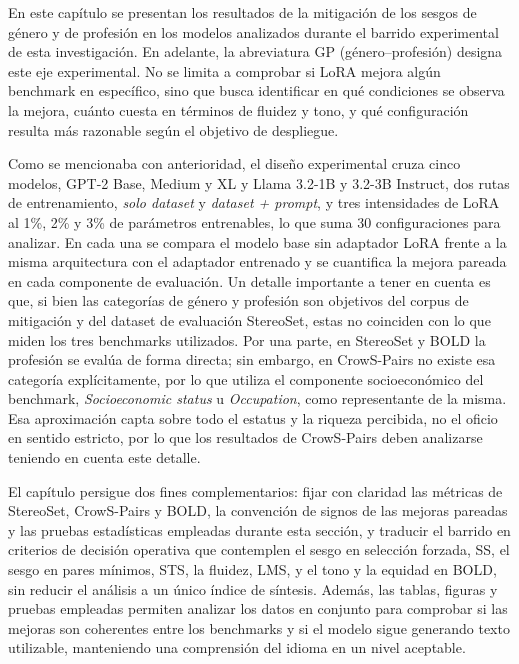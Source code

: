 \documentclass[12pt,a4paper]{report}
\newcommand{\GP}{GP (género--profesión)}
\begin{document}
En este capítulo se presentan los resultados de la mitigación de los sesgos de género y de profesión en los modelos analizados durante el barrido experimental de esta investigación. En adelante, la abreviatura \GP{} designa este eje experimental. No se limita a comprobar si LoRA mejora algún benchmark en específico, sino que busca identificar en qué condiciones se observa la mejora, cuánto cuesta en términos de fluidez y tono, y qué configuración resulta más razonable según el objetivo de despliegue.

Como se mencionaba con anterioridad, el diseño experimental cruza cinco modelos, GPT-2 Base, Medium y XL y Llama 3.2-1B y 3.2-3B Instruct, dos rutas de entrenamiento, \textit{solo dataset} y \textit{dataset + prompt}, y tres intensidades de LoRA al 1\%, 2\% y 3\% de parámetros entrenables, lo que suma 30 configuraciones para analizar. En cada una se compara el modelo base sin adaptador LoRA frente a la misma arquitectura con el adaptador entrenado y se cuantifica la mejora pareada en cada componente de evaluación. Un detalle importante a tener en cuenta es que, si bien las categorías de género y profesión son objetivos del corpus de mitigación y del dataset de evaluación StereoSet, estas no coinciden con lo que miden los tres benchmarks utilizados. Por una parte, en StereoSet y BOLD la profesión se evalúa de forma directa; sin embargo, en CrowS-Pairs no existe esa categoría explícitamente, por lo que utiliza el componente socioeconómico del benchmark, \textit{Socioeconomic status} u \textit{Occupation}, como representante de la misma. Esa aproximación capta sobre todo el estatus y la riqueza percibida, no el oficio en sentido estricto, por lo que los resultados de CrowS-Pairs deben analizarse teniendo en cuenta este detalle.

El capítulo persigue dos fines complementarios: fijar con claridad las métricas de StereoSet, CrowS-Pairs y BOLD, la convención de signos de las mejoras pareadas y las pruebas estadísticas empleadas durante esta sección, y traducir el barrido en criterios de decisión operativa que contemplen el sesgo en selección forzada, SS, el sesgo en pares mínimos, STS, la fluidez, LMS, y el tono y la equidad en BOLD, sin reducir el análisis a un único índice de síntesis. Además, las tablas, figuras y pruebas empleadas permiten analizar los datos en conjunto para comprobar si las mejoras son coherentes entre los benchmarks y si el modelo sigue generando texto utilizable, manteniendo una comprensión del idioma en un nivel aceptable.
\end{document}
